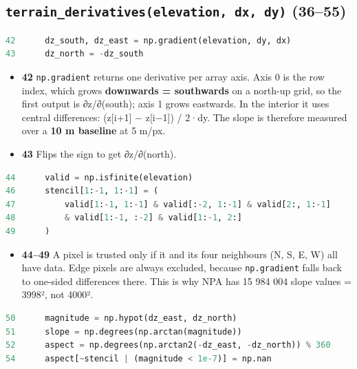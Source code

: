 \documentclass[11pt,a4paper]{article}
\providecommand{\tightlist}{\setlength{\itemsep}{0pt}\setlength{\parskip}{0pt}}
\begin{document}
\hypertarget{terrain_derivativeselevation-dx-dy-3655}{%
\subsection{\texorpdfstring{\texttt{terrain\_derivatives(elevation,\ dx,\ dy)}
(36--55)}{terrain\_derivatives(elevation, dx, dy) (36--55)}}\label{terrain_derivativeselevation-dx-dy-3655}}

\begin{lstlisting}[language=Python]
42      dz_south, dz_east = np.gradient(elevation, dy, dx)
43      dz_north = -dz_south
\end{lstlisting}

\begin{itemize}
\tightlist
\item
  \textbf{42} \texttt{np.gradient} returns one
  derivative per array axis. Axis 0 is the row index, which grows
  \textbf{downwards = southwards} on a north-up grid, so the first
  output is ∂z/∂(south); axis 1 grows eastwards. In the interior it uses
  central differences: (z{[}i+1{]} − z{[}i−1{]}) / 2·dy. The slope is
  therefore measured over a \textbf{10 m baseline} at 5 m/px.
\item
  \textbf{43} Flips the sign to get ∂z/∂(north).
\end{itemize}

\begin{lstlisting}[language=Python]
44      valid = np.isfinite(elevation)
46      stencil[1:-1, 1:-1] = (
47          valid[1:-1, 1:-1] & valid[:-2, 1:-1] & valid[2:, 1:-1]
48          & valid[1:-1, :-2] & valid[1:-1, 2:]
49      )
\end{lstlisting}

\begin{itemize}
\tightlist
\item
  \textbf{44--49} A pixel is trusted only if it and its four neighbours
  (N, S, E, W) all have data. Edge pixels are always excluded, because
  \texttt{np.gradient} falls back to one-sided
  differences there. This is why NPA has 15 984 004 slope values =
  3998², not 4000².
\end{itemize}

\begin{lstlisting}[language=Python]
50      magnitude = np.hypot(dz_east, dz_north)
51      slope = np.degrees(np.arctan(magnitude))
52      aspect = np.degrees(np.arctan2(-dz_east, -dz_north)) % 360
54      aspect[~stencil | (magnitude < 1e-7)] = np.nan
\end{lstlisting}
\end{document}
